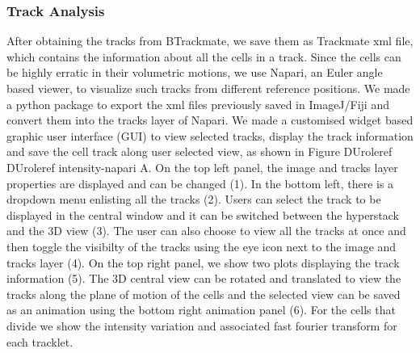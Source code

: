 \documentclass[letterpaper,compsoc,twoside]{IEEEtran}
\providecommand*{\DUrole}[2]{%
  \ifcsname DUrole#1\endcsname%
    \csname DUrole#1\endcsname{#2}%
  \else%
    #2%
  \fi%
}
\begin{document}
\subsubsection{Track Analysis%
  \label{track-analysis}%
}


After obtaining the tracks from BTrackmate, we save them as Trackmate xml file, which contains the information about all the cells in a track. Since the cells can be highly erratic in their volumetric motions, we use Napari, an Euler angle based viewer, to visualize such tracks from different reference positions.  We made a python package to export the xml files previously saved in ImageJ/Fiji and convert them into the tracks layer of Napari. We made a customised widget based graphic user interface (GUI) to view selected tracks, display the track information and save the cell track along user selected view, as shown in
Figure \DUrole{ref}{intensity-napari} A. On the top left panel, the image and tracks layer properties are displayed and can be changed (1). In the bottom left, there is a dropdown menu enlisting all the tracks (2). Users can select the track to be displayed in the central window and it can be switched between the hyperstack and the 3D view (3). The user can also choose to view all the tracks at once and then toggle the visibilty of the tracks using the eye icon next to the image and tracks layer (4). On the top right panel, we show two plots displaying the track information (5). The 3D central view can be rotated and translated to view the tracks along the plane of motion of the cells and the selected view can be saved as an animation using the bottom right animation panel (6). For the cells that divide we show the intensity variation and associated fast fourier transform for each tracklet.
\end{document}
